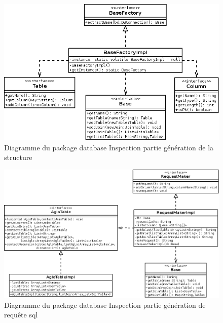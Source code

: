 \documentclass[12pt]{report}
\begin{document}
\begin{figure}[h!]
\begin{center}
\includegraphics[scale=0.5]{bduml/baseFactory.png}
\caption{Diagramme du package database Inspection partie génération de la structure}
\end{center}
\end{figure}

\begin{figure}[h!]
\begin{center}
\includegraphics[scale=0.5]{bduml/cookingRequeste.png}
\caption{Diagramme du package database Inspection partie génération de requête sql}
\end{center}
\end{figure}
\end{document}
